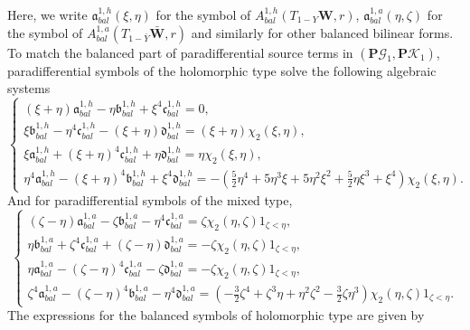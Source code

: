 \documentclass[10pt]{amsart}
\theoremstyle{remark}
\theoremstyle{definition}
\numberwithin{equation}{section}
\newcommand{\f}{\frac}
\newcommand{\bw}{\mathbf{W}}
\newcommand{\nP}{{\mathbf P}}
\begin{document}
Here, we write $\mathfrak{a}^{1,h}_{bal}(\xi, \eta)$ for the symbol of $A^{1,h}_{bal}(T_{1-Y}\bw,r)$, $\mathfrak{a}^{1,a}_{bal}(\eta, \zeta)$ for the symbol of $A^{1,a}_{bal}(T_{1-\bar{Y}}\bar{\bw},r)$ and similarly for other balanced bilinear forms.
To match the balanced part of paradifferential source terms in $(\nP\mathcal{G}_1, \nP\mathcal{K}_1)$, paradifferential symbols of the holomorphic type solve the following algebraic systems
\begin{equation*}
\begin{cases}
(\xi + \eta)\mathfrak{a}^{1,h}_{bal}-\eta\mathfrak{b}^{1,h}_{bal}+\xi^4\mathfrak{c}^{1,h}_{bal}=0,\\
\xi\mathfrak{b}^{1,h}_{bal}-\eta^4\mathfrak{c}^{1,h}_{bal}-(\xi+\eta)\mathfrak{d}^{1,h}_{bal}=(\xi+\eta)\chi_{2}(\xi,\eta),\\
\xi\mathfrak{a}^{1,h}_{bal}+(\xi+\eta)^4\mathfrak{c}^{1,h}_{bal}+\eta\mathfrak{d}^{1,h}_{bal}=\eta\chi_{2}(\xi,\eta),\\
\eta^4 \mathfrak{a}^{1,h}_{bal}-(\xi+\eta)^4\mathfrak{b}^{1,h}_{bal}+\xi^4\mathfrak{d}^{1,h}_{bal}=-\left(\f52\eta^4+5\eta^3\xi+5\eta^2\xi^2+\f52\eta\xi^3+\xi^4\right)\chi_{2}(\xi,\eta).
\end{cases}
\end{equation*}
And for paradifferential symbols of the mixed type,
\begin{equation*}
\begin{cases}
(\zeta-\eta)\mathfrak{a}^{1,a}_{bal}-\zeta\mathfrak{b}^{1,a}_{bal}-\eta^4\mathfrak{c}^{1,a}_{bal}=\zeta\chi_{2}(\eta,\zeta)1_{\zeta<\eta},\\
\eta\mathfrak{b}^{1,a}_{bal}+\zeta^4\mathfrak{c}^{1,a}_{bal}+(\zeta-\eta)\mathfrak{d}^{1,a}_{bal}=-\zeta\chi_{2}(\eta,\zeta)1_{\zeta<\eta},\\
\eta\mathfrak{a}^{1,a}_{bal}-(\zeta-\eta)^4\mathfrak{c}^{1,a}_{bal}-\zeta\mathfrak{d}^{1,a}_{bal}=-\zeta\chi_{2}(\eta,\zeta)1_{\zeta<\eta},\\
\zeta^4 \mathfrak{a}^{1,a}_{bal}-(\zeta-\eta)^4\mathfrak{b}^{1,a}_{bal}-\eta^4\mathfrak{d}^{1,a}_{bal}=\left(-\f32\zeta^4+\zeta^3\eta+\eta^2\zeta^2-\f32\zeta\eta^3\right)\chi_{2}(\eta,\zeta)1_{\zeta<\eta}.
\end{cases}
\end{equation*}
The expressions for the balanced symbols of holomorphic type are given by
\end{document}
